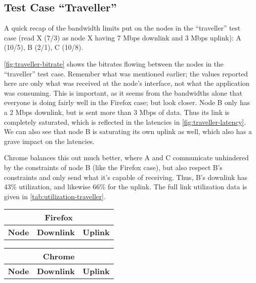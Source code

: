\subsection{Test Case ``Traveller''}

A quick recap of the bandwidth limits put on the nodes in the ``traveller'' test case (read X (7/3) as node X having 7 Mbps downlink and 3 Mbps uplink): A (10/5), B (2/1), C (10/8).

\autoref{fig:traveller-bitrate} shows the bitrates flowing between the nodes in the ``traveller'' test case. Remember what was mentioned earlier; the values reported here are only what was received at the node's interface, not what the application was consuming. This is important, as it seems from the bandwidths alone that everyone is doing fairly well in the Firefox case; but look closer. Node B only has a 2 Mbps downlink, but is sent more than 3 Mbps of data. Thus its link is completely saturated, which is reflected in the latencies in \autoref{fig:traveller-latency}. We can also see that node B is saturating its own uplink as well, which also has a grave impact on the latencies.

Chrome balances this out much better, where A and C communicate unhindered by the constraints of node B (like the Firefox case), but also respect B's constraints and only send what it's capable of receiving. Thus, B's downlink has 43\% utilization, and likewise 66\% for the uplink. The full link utilization data is given in \autoref{tab:utilization-traveller}.

\begin{center}
    \label{tab:utilization-traveller}
    \begin{tabular}{| l | l | l |}
    \multicolumn{3}{c}{\textbf{Firefox}} \\ \hline
    \textbf{Node} & \textbf{Downlink} & \textbf{Uplink} \\ \hline
    
    \hline
    \end{tabular}
    \hfill
    \begin{tabular}{| l | l | l |}
    \multicolumn{3}{c}{\textbf{Chrome}} \\ \hline
    \textbf{Node} & \textbf{Downlink} & \textbf{Uplink} \\ \hline
    
    \hline
    \end{tabular}
\end{center}


